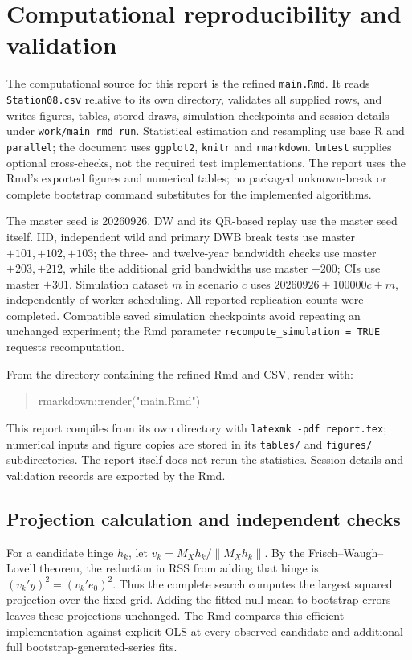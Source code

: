\documentclass[11pt,a4paper]{article}
\begin{document}
\clearpage\section{Computational reproducibility and validation}\label{app:computation}
The computational source for this report is the refined \texttt{main.Rmd}. It reads \texttt{Station08.csv} relative to its own directory, validates all supplied rows, and writes figures, tables, stored draws, simulation checkpoints and session details under \texttt{work/main\_rmd\_run}. Statistical estimation and resampling use base R and \texttt{parallel}; the document uses \texttt{ggplot2}, \texttt{knitr} and \texttt{rmarkdown}. \texttt{lmtest} supplies optional cross-checks, not the required test implementations. The report uses the Rmd's exported figures and numerical tables; no packaged unknown-break or complete bootstrap command substitutes for the implemented algorithms.

The master seed is 20260926. DW and its QR-based replay use the master seed itself. IID, independent wild and primary DWB break tests use master $+101,+102,+103$; the three- and twelve-year bandwidth checks use master $+203,+212$, while the additional grid bandwidths use master $+200$; CIs use master $+301$. Simulation dataset $m$ in scenario $c$ uses $20260926+100000c+m$, independently of worker scheduling. All reported replication counts were completed. Compatible saved simulation checkpoints avoid repeating an unchanged experiment; the Rmd parameter \texttt{recompute\_simulation = TRUE} requests recomputation.

From the directory containing the refined Rmd and CSV, render with:
\begin{quote}\small\ttfamily
rmarkdown::render("main.Rmd")
\end{quote}
This report compiles from its own directory with \texttt{latexmk -pdf report.tex}; numerical inputs and figure copies are stored in its \texttt{tables/} and \texttt{figures/} subdirectories. The report itself does not rerun the statistics. Session details and validation records are exported by the Rmd.

\subsection{Projection calculation and independent checks}
For a candidate hinge $h_k$, let $v_k=M_Xh_k/\|M_Xh_k\|$. By the Frisch--Waugh--Lovell theorem, the reduction in RSS from adding that hinge is $(v_k'y)^2=(v_k'e_0)^2$. Thus the complete search computes the largest squared projection over the fixed grid. Adding the fitted null mean to bootstrap errors leaves these projections unchanged. The Rmd compares this efficient implementation against explicit OLS at every observed candidate and additional full bootstrap-generated-series fits.
\end{document}
